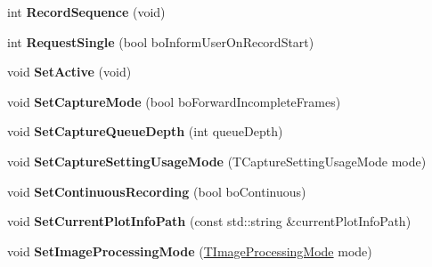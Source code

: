 \begin{DoxyCompactItemize}
\item 
\hypertarget{class_capture_thread_a73c2d904b53dfc97060e712cbe986cfd}{int {\bfseries Record\+Sequence} (void)}\label{class_capture_thread_a73c2d904b53dfc97060e712cbe986cfd}

\item 
\hypertarget{class_capture_thread_a26a787c952ba608057d81706282810e4}{int {\bfseries Request\+Single} (bool bo\+Inform\+User\+On\+Record\+Start)}\label{class_capture_thread_a26a787c952ba608057d81706282810e4}

\item 
\hypertarget{class_capture_thread_a5d2ea3644da05b8fc70ae4db4edaaa46}{void {\bfseries Set\+Active} (void)}\label{class_capture_thread_a5d2ea3644da05b8fc70ae4db4edaaa46}

\item 
\hypertarget{class_capture_thread_a63f88ba9bb3805502b4bf120cd6bfb29}{void {\bfseries Set\+Capture\+Mode} (bool bo\+Forward\+Incomplete\+Frames)}\label{class_capture_thread_a63f88ba9bb3805502b4bf120cd6bfb29}

\item 
\hypertarget{class_capture_thread_a4d46acc8493f77073abe6518c4a2c96c}{void {\bfseries Set\+Capture\+Queue\+Depth} (int queue\+Depth)}\label{class_capture_thread_a4d46acc8493f77073abe6518c4a2c96c}

\item 
\hypertarget{class_capture_thread_ad886773c55d2de26cd39e4acae723e2b}{void {\bfseries Set\+Capture\+Setting\+Usage\+Mode} (T\+Capture\+Setting\+Usage\+Mode mode)}\label{class_capture_thread_ad886773c55d2de26cd39e4acae723e2b}

\item 
\hypertarget{class_capture_thread_a9c9bdd94288f4c453c58460b19ab8b93}{void {\bfseries Set\+Continuous\+Recording} (bool bo\+Continuous)}\label{class_capture_thread_a9c9bdd94288f4c453c58460b19ab8b93}

\item 
\hypertarget{class_capture_thread_ac33ec0ae29f3334e31b16f20f715b0f8}{void {\bfseries Set\+Current\+Plot\+Info\+Path} (const std\+::string \&current\+Plot\+Info\+Path)}\label{class_capture_thread_ac33ec0ae29f3334e31b16f20f715b0f8}

\item 
\hypertarget{class_capture_thread_a47721b704497e30384749c32284e3543}{void {\bfseries Set\+Image\+Processing\+Mode} (\hyperlink{group___common_interface_gaee0074fce284fcdf9ead4ad607e85a06}{T\+Image\+Processing\+Mode} mode)}\label{class_capture_thread_a47721b704497e30384749c32284e3543}


\end{DoxyCompactItemize}
